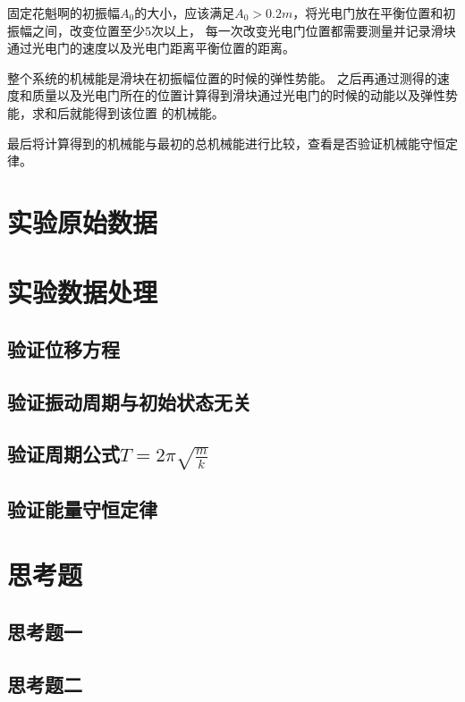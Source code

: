 \documentclass{ctexart}
\begin{document}
  固定花魁啊的初振幅$A_{0}$的大小，应该满足$A_{0}>0.2m$，将光电门放在平衡位置和初振幅之间，改变位置至少5次以上，
  每一次改变光电门位置都需要测量并记录滑块通过光电门的速度以及光电门距离平衡位置的距离。

  整个系统的机械能是滑块在初振幅位置的时候的弹性势能。
  之后再通过测得的速度和质量以及光电门所在的位置计算得到滑块通过光电门的时候的动能以及弹性势能，求和后就能得到该位置
  的机械能。

  最后将计算得到的机械能与最初的总机械能进行比较，查看是否验证机械能守恒定律。

\section{实验原始数据}

\section{实验数据处理}
  \subsection{验证位移方程}
  \subsection{验证振动周期与初始状态无关}
  \subsection{验证周期公式$T=2\pi \sqrt{\frac{m}{k}}$}
  \subsection{验证能量守恒定律}

\section{思考题}
  \subsection{思考题一}
  \subsection{思考题二}
\end{document}
